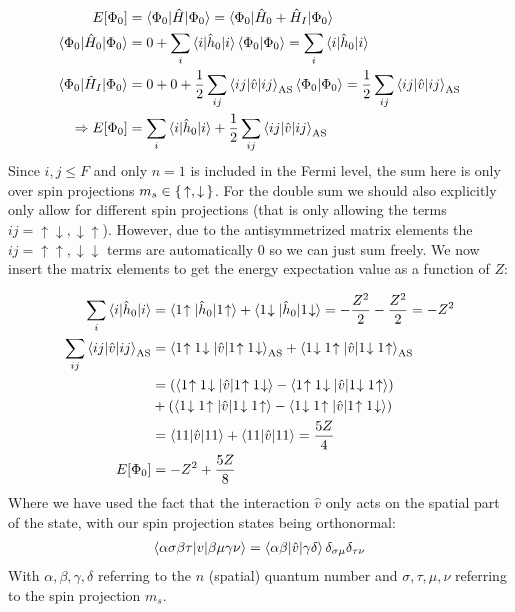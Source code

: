\documentclass{article}
\newcommand{\upst}[1]{#1\hspace{-2px}\uparrow}
\newcommand{\downst}[1]{#1\hspace{-2px}\downarrow}
\newcommand{\inner}[3]{\braket{#1|#2|#3}}
\newcommand{\innerAS}[3]{\inner{#1}{#2}{#3}_{\text{AS}}}
\newcommand{\hnull}{\hat{h}_0}
\begin{document}
    \begin{align*}
        E[\Phi_0] &= \inner{\Phi_0}{\hat{H}}{\Phi_0} = \inner{\Phi_0}{\hat{H}_0 + \hat{H}_I}{\Phi_0} \\ 
        \inner{\Phi_0}{\hat{H}_0}{\Phi_0} &= 0 + \sum_i \inner{i}{\hnull}{i} \braket{\Phi_0 | \Phi_0} = \sum_i \inner{i}{\hnull}{i} \\
        \inner{\Phi_0}{\hat{H}_I}{\Phi_0} &= 0 + 0 + \frac{1}{2}\sum_{ij} \innerAS{ij}{\hat{v}}{ij}\braket{\Phi_0|\Phi_0} = \frac{1}{2}\sum_{ij} \innerAS{ij}{\hat{v}}{ij} \\
        \Rightarrow E[\Phi_0] &= \sum_i \inner{i}{\hnull}{i} + \frac{1}{2}\sum_{ij} \innerAS{ij}{\hat{v}}{ij}
    \end{align*}
    Since $i,j \leq F$ and only $n=1$ is included in the Fermi level, the sum here is only over spin projections $m_s \in \set{\uparrow, \downarrow}$. For the double sum we should also explicitly only allow for different spin projections (that is only allowing the terms $ij = \uparrow\downarrow, \downarrow\uparrow$). However, due to the antisymmetrized matrix elements the $ij = \uparrow\uparrow,\downarrow\downarrow$ terms are automatically 0 so we can just sum freely. We now insert the matrix elements to get the energy expectation value as a function of $Z$:

    \begin{align*}
        \sum_{i} \inner{i}{\hnull}{i} &= \inner{\upst{1}}{\hnull}{\upst{1}} + \inner{\downst{1}}{\hnull}{\downst{1}} = -\frac{Z^2}{2} -\frac{Z^2}{2} = -Z^2 \\
        \sum_{ij} \innerAS{ij}{\hat{v}}{ij}  &=\innerAS{\upst{1}\downst{1}}{\hat{v}}{\upst{1}\downst{1}} + \innerAS{\downst{1}\upst{1}}{\hat{v}}{\downst{1}\upst{1}} \\
        &=  (\inner{\upst{1}\downst{1}}{\hat{v}}{\upst{1}\downst{1}} - \inner{\upst{1}\downst{1}}{\hat{v}}{\downst{1}\upst{1}}) \\
        &+(\inner{\downst{1}\upst{1}}{\hat{v}}{\downst{1}\upst{1}} - \inner{\downst{1}\upst{1}}{\hat{v}}{\upst{1}\downst{1}}) \\
        &= \inner{11}{\hat{v}}{11} + \inner{11}{\hat{v}}{11} = \frac{5Z}{4} \\
        E[\Phi_0] &= -Z^2 + \frac{5Z}{8}
    \end{align*}
    Where we have used the fact that the interaction $\hat{v}$ only acts on the spatial part of the state, with our spin projection states being orthonormal:
    \begin{align*}
        \inner{\alpha\sigma\beta\tau}{v}{\beta\mu\gamma\nu} = \inner{\alpha \beta}{\hat{v}}{\gamma \delta} \delta_{\sigma\mu}\delta_{\tau\nu}
    \end{align*}
    With $\alpha, \beta, \gamma, \delta$ referring to the $n$ (spatial) quantum number and $\sigma, \tau, \mu, \nu$ referring to the spin projection $m_s$.
\end{document}
